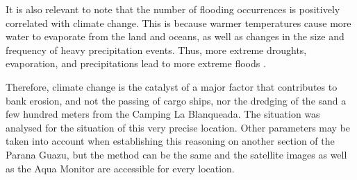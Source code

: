 It is also relevant to note that the number of flooding occurrences is positively correlated with climate change. This is because warmer temperatures cause more water to evaporate from the land and oceans, as well as changes in the size and frequency of heavy precipitation events. Thus, more extreme droughts, evaporation, and precipitations lead to more extreme floods \autocite{usepaClimateChangeIndicators2016}.

Therefore, climate change is the catalyst of a major factor that contributes to bank erosion, and not the passing of cargo ships, nor the dredging of the sand a few hundred meters from the Camping La Blanqueada.
The situation was analysed for the situation of this very precise location. Other parameters may be taken into account when establishing this reasoning on another section of the Parana Guazu, but the method can be the same and the satellite images as well as the Aqua Monitor are accessible for every location. 

 